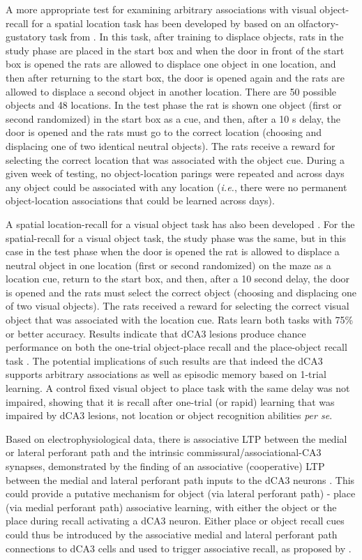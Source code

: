 \documentclass[doc, longtable]{apa6}
\begin{document}
A more appropriate test for examining arbitrary associations with visual object-recall for a spatial location task has been developed by \textcite{Kesner2008a} based on an olfactory-gustatory task from \textcite{day2003glutamate}. In this task, after training to displace objects, rats in the study phase are placed in the start box and when the door in front of the start box is opened the rats are allowed to displace one object in one location, and then after returning to the start box, the door is opened again and the rats are allowed to displace a second object in another location. There are 50 possible objects and 48 locations. In the test phase the rat is shown one object (first or second randomized) in the start box as a cue, and then, after a 10 s delay, the door is opened and the rats must go to the correct location (choosing and displacing one of two identical neutral objects). The rats receive a reward for selecting the correct location that was associated with the object cue. During a given week of testing, no object-location parings were repeated and across days any object could be associated with any location (\textit{i.e.}, there were no permanent object-location associations that could be learned across days).

A spatial location-recall for a visual object task has also been developed \parencite{Kesner2008a}. For the spatial-recall for a visual object task, the study phase was the same, but in this case in the test phase when the door is opened the rat is allowed to displace a neutral object in one location (first or second randomized) on the maze as a location cue, return to the start box, and then, after a 10 second delay, the door is opened and the rats must select the correct object (choosing and displacing one of two visual objects). The rats received a reward for selecting the correct visual object that was associated with the location cue. Rats learn both tasks with 75\% or better accuracy. Results indicate that dCA3 lesions produce chance performance on both the one-trial object-place recall and the place-object recall task \parencite{Kesner2008a}. The potential implications of such results are that indeed the dCA3 supports arbitrary associations as well as episodic memory based on 1-trial learning. A control fixed visual object to place task with the same delay was not impaired, showing that it is recall after one-trial (or rapid) learning that was impaired by dCA3 lesions, not location or object recognition abilities \textit{per se}. 

Based on electrophysiological data, there is associative LTP between the medial or lateral perforant path and the intrinsic commissural/associational-CA3 synapses, demonstrated by the finding of an associative (cooperative) LTP between the medial and lateral perforant path inputs to the dCA3 neurons \parencite{Martinez2002a}. This could provide a putative mechanism for object (via lateral perforant path) - place (via medial perforant path) associative learning, with either the object or the place during recall activating a dCA3 neuron. Either place or object recall cues could thus be introduced by the associative medial and lateral perforant path connections to dCA3 cells and used to trigger associative recall, as proposed by \textcite{Hunsaker2007c}. 
\end{document}
